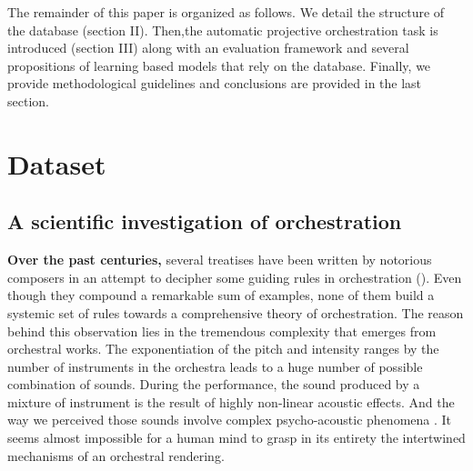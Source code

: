 \documentclass[twoside,twocolumn]{article}
\begin{document}
The remainder of this paper is organized as follows. We detail the structure of the database (section II). Then,the automatic projective orchestration task is introduced (section III) along with an evaluation framework and several propositions of learning based models that rely on the database. Finally, we provide methodological guidelines and conclusions are provided in the last section.

\section{Dataset}
\subsection{A scientific investigation of orchestration}
\textbf{Over the past centuries,} several treatises have been written by notorious composers in an attempt to decipher some guiding rules in orchestration (\cite{koechli_orch,piston-orch,Rimsky-Korsakov:1873aa}).
Even though they compound a remarkable sum of examples, none of them build a systemic set of rules towards a comprehensive theory of orchestration.
The reason behind this observation lies in the tremendous complexity that emerges from orchestral works. The exponentiation of the pitch and intensity ranges by the number of instruments in the orchestra leads to a huge number of possible combination of sounds. During the performance, the sound produced by a mixture of instrument is the result of highly non-linear acoustic effects. And the way we perceived those sounds involve complex psycho-acoustic phenomena \cite{lembke2012timbre,tardieu2012perception,mcadams2009perception}.
It seems almost impossible for a human mind to grasp in its entirety the intertwined mechanisms of an orchestral rendering.
\end{document}
